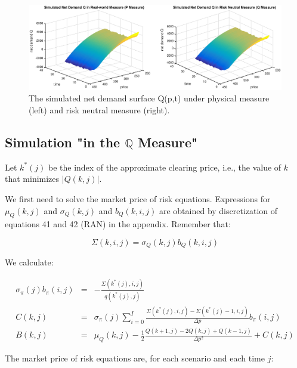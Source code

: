 \documentclass{article}
\begin{document}
\begin{center}
\begin{figure}[tbp]
\centering
\includegraphics[scale = 0.5]{Q_both_measures.eps}\newline
\caption{The simulated net demand surface Q(p,t) under physical measure
(left) and risk neutral measure (right).}
\label{fig::AAPL_20110401_simulated_both_measures}
\end{figure}
\end{center}

\subsection{Simulation "in the $\mathbb{Q}$ Measure"}

Let $k^{\ast }(j)$ be the index of the approximate clearing price, i.e., the
value of $k$ that minimizes $|Q(k,j)|$.

We first need to solve the market price of risk equations. Expressions for $%
\mu _{Q}(k,j)$ and $\sigma _{Q}(k,j)$ and $b_{Q}(k,i,j)$ are obtained by
discretization of equations 41 and 42 (RAN) in the appendix. Remember that:

\begin{equation*}
\Sigma(k,i,j)=\sigma _{Q}(k,j)b_{Q}(k,i,j)
\end{equation*}

We calculate:

\begin{eqnarray*}
\sigma _{\pi }(j)b_{\pi }(i,j) &=&-\frac{\Sigma(k^{\ast }(j),i,j)}{q(k^{\ast
}(j),j)} \\
C(k,j) &=&\sigma _{\pi }(j)\sum_{i=0}^{I}\frac{\Sigma(k^{\ast
}(j),i,j)-\Sigma(k^{\ast }(j)-1,i,j)}{\Delta p}b_{\pi }(i,j) \\
B(k,j) &=&\mu _{Q}(k,j)-\frac{1}{2}\frac{Q(k+1,j)-2Q(k,j)+Q(k-1,j)}{\Delta
p^{2}}+C(k,j)
\end{eqnarray*}

The market price of risk equations are, for each scenario and each time $j$:
\end{document}
